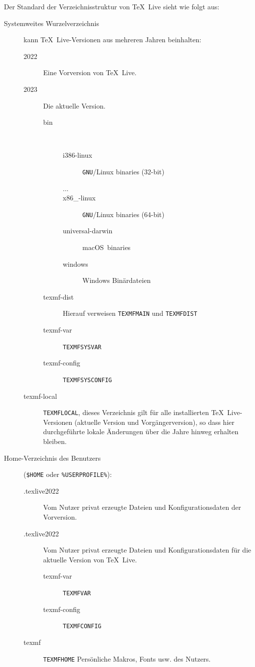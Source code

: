 \documentclass[12pt,ngerman,a4paper,fullparskip]{report}
\newcommand{\TL}{\TeX\ Live\xspace}
\newcommand{\acro}[1]{\texttt{#1}}
\newcommand{\envname}[1]{\texttt{#1}}
\providecommand*{\GNU}{\acro{GNU}\xspace}
\providecommand*{\macOS}{macOS\xspace}
\begin{document}
Der Standard der Verzeichnisstruktur von \TL sieht wie folgt aus:
\begin{description}
  \item[Systemweites Wurzelverzeichnis] kann \TL{}-Versionen aus mehreren Jahren beinhalten:
  \begin{description}
    \item[2022] Eine Vorversion von \TL.
    \item[2023] Die aktuelle Version.
    \begin{description}
      \item [bin] ~
      \begin{description}
        \item [i386-linux] \GNU/Linux binaries (32-bit)
        \item [...]
        \item [x86\_-linux] \GNU/Linux binaries (64-bit)
        \item [universal-darwin] \macOS\ binaries
        \item [windows] Windows Binärdateien
      \end{description}
      \item [texmf-dist\ \ ] Hierauf verweisen \envname{TEXMFMAIN} und \envname{TEXMFDIST}
      \item [texmf-var\ \ ] \envname{TEXMFSYSVAR}
      \item [texmf-config \ \ ] \envname{TEXMFSYSCONFIG}
    \end{description}
    \item [texmf-local] \envname{TEXMFLOCAL}, dieses Verzeichnis gilt für alle installierten \TL-Versionen
         (aktuelle Version und Vorgängerversion), so dass hier durchgeführte lokale Änderungen über die
         Jahre hinweg erhalten bleiben.
  \end{description}
  \item[Home-Verzeichnis des Benutzers]
      (\texttt{\$HOME} oder \texttt{\%USERPROFILE\%}):
    \begin{description}
      \item[.texlive2022] Vom Nutzer privat erzeugte Dateien und Konfigurationsdaten
        der Vorversion.
      \item[.texlive2022] Vom Nutzer privat erzeugte Dateien und Konfigurationsdaten
        für die aktuelle Version von \TL.
      \begin{description}
        \item [texmf-var\ \ \ ] \envname{TEXMFVAR}
        \item [texmf-config] \envname{TEXMFCONFIG}
      \end{description}
    \item[texmf] \envname{TEXMFHOME} Persönliche Makros, Fonts usw. des Nutzers.
  \end{description}
\end{description}
\end{document}
